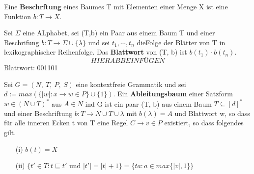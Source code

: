     Eine \textbf{Beschrftung} eines Baumes T mit Elementen einer Menge X ist eine Funktion \(b: T \to X\).

    Sei \(\Sigma\) eine ALphabet, sei (T,b) ein Paar aus einem Baum T und einer Beschrifung \(b: T \to \Sigma \cup \{\lambda\}\) und sei \(t_1, \cdots, t_n\) dieFolge der Blätter von T in lexikographischer Reihenfolge. Das \textbf{Blattwort} von (T, b) ist \(b(t_1) \cdot b(t_n)\). \[HIER ABB EINFÜGEN\] Blattwort: 001101

    Sei \(G = (N,\ T,\ P,\ S)\) eine kontextfreie Grammatik und sei \(d:= max (\{|w|: x \to w \in P\} \cup \{1\})\). Ein \textbf{Ableitungsbaum} einer Satzform \(w \in (N \cup T)^*\) aus \(A \in N\) ind G ist ein paar (T, b) aus einem Baum \(T \subseteq [d]^*\) und einer Beschriftung \(b: T \to N \cup T \cup {\lambda}\) mit \(b(\lambda) = A\) und Blattwort w, so dass für alle inneren Ecken t von T eine Regel \(C \to v \in P\) existiert, so dass folgendes gilt.
    \begin{itemize}
        \item [(i)] \(b(t) = X\)
        \item [(ii)] \(\{t' \in T : t \sqsubseteq t' \text{ und } |t'| = |t| + 1\} = \{ta : a \in max \{|v|, 1\}\}\)
    \end{itemize}
